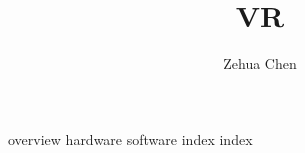 \documentclass[letterpaper, 11pt]{report}
\title{VR}
\author{Zehua Chen}
\begin{document}
  \maketitle
  \tableofcontents

  {overview}
  {hardware}
  {software}
  {index}
  {index}
\end{document}
